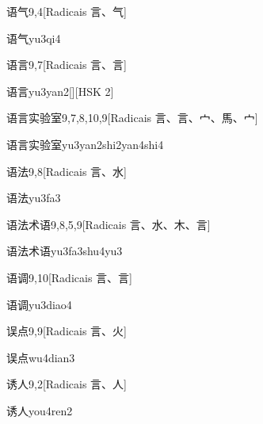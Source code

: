 \begin{entry}{语气}{9,4}[Radicais ⾔、⽓]
  \begin{phonetics}{语气}{yu3qi4}
  \end{phonetics}
\end{entry}

\begin{entry}{语言}{9,7}[Radicais ⾔、⾔]
  \begin{phonetics}{语言}{yu3yan2}[][HSK 2]
  \end{phonetics}
\end{entry}

\begin{entry}{语言实验室}{9,7,8,10,9}[Radicais ⾔、⾔、⼧、⾺、⼧]
  \begin{phonetics}{语言实验室}{yu3yan2shi2yan4shi4}
  \end{phonetics}
\end{entry}

\begin{entry}{语法}{9,8}[Radicais ⾔、⽔]
  \begin{phonetics}{语法}{yu3fa3}
  \end{phonetics}
\end{entry}

\begin{entry}{语法术语}{9,8,5,9}[Radicais ⾔、⽔、⽊、⾔]
  \begin{phonetics}{语法术语}{yu3fa3shu4yu3}
  \end{phonetics}
\end{entry}

\begin{entry}{语调}{9,10}[Radicais ⾔、⾔]
  \begin{phonetics}{语调}{yu3diao4}
  \end{phonetics}
\end{entry}

\begin{entry}{误点}{9,9}[Radicais ⾔、⽕]
  \begin{phonetics}{误点}{wu4dian3}
  \end{phonetics}
\end{entry}

\begin{entry}{诱人}{9,2}[Radicais ⾔、⼈]
  \begin{phonetics}{诱人}{you4ren2}
  \end{phonetics}
\end{entry}


